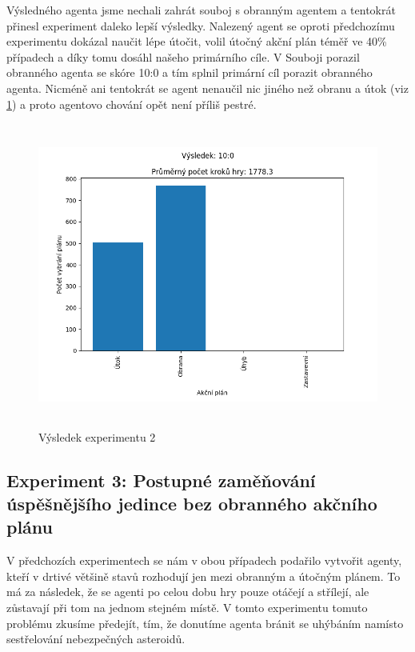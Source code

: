 Výsledného agenta jsme nechali zahrát souboj s obranným agentem a tentokrát přinesl experiment daleko lepší výsledky.
Nalezený agent se oproti předchozímu experimentu dokázal naučit lépe útočit, volil útočný akční plán téměř ve 40\% případech a díky tomu dosáhl našeho primárního cíle. V Souboji porazil obranného agenta se skóre 10:0 a tím splnil primární cíl porazit obranného agenta.
Nicméně ani tentokrát se agent nenaučil nic jiného než obranu a útok (viz \ref{Výsledek experimentu 02}) a proto agentovo chování opět není příliš pestré. 

 


\begin{figure}[H]\centering
\includegraphics[width=125mm, height=100mm]{./Obrazky/Experiment02Results.png}
\caption{Výsledek experimentu 2}
\label{Výsledek experimentu 02}
\end{figure}



\newpage
\subsection{Experiment 3: Postupné zaměňování úspěšnějšího jedince bez obranného akčního plánu}

V předchozích experimentech se nám v obou případech podařilo vytvořit agenty, kteří v drtivé většině stavů rozhodují jen mezi obranným a útočným plánem.
To má za následek, že se agenti po celou dobu hry pouze otáčejí a střílejí, ale zůstavají při tom na jednom stejném místě.
V tomto experimentu tomuto problému zkusíme předejít, tím, že donutíme agenta bránit se uhýbáním namísto sestřelování nebezpečných asteroidů.


